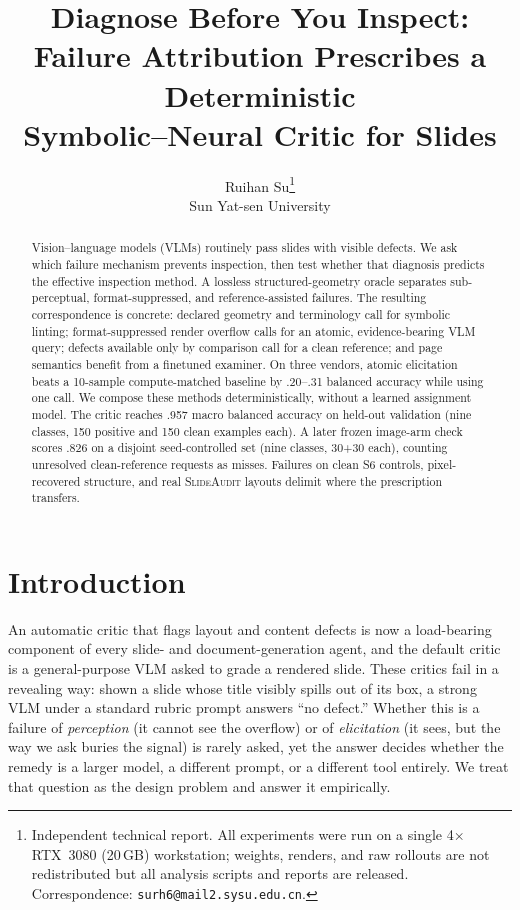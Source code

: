 \documentclass[10pt]{article}
\title{\bf Diagnose Before You Inspect:\\[2pt]
Failure Attribution Prescribes a Deterministic\\ Symbolic--Neural Critic for Slides}
\author{Ruihan Su\thanks{Independent technical report. All experiments were run on a single
4$\times$RTX~3080 (20\,GB) workstation; weights, renders, and raw rollouts are not redistributed but
all analysis scripts and reports are released. Correspondence: \texttt{surh6@mail2.sysu.edu.cn}.}\\[3pt]
\normalsize Sun Yat-sen University}
\date{}
\newcommand{\g}[1]{\textsf{#1}}        %
\begin{document}
\maketitle

\begin{abstract}
\noindent
Vision--language models (VLMs) routinely pass slides with visible defects. We ask which failure mechanism
prevents inspection, then test whether that diagnosis predicts the effective inspection method. A lossless
structured-geometry oracle separates sub-perceptual, format-suppressed, and reference-assisted failures.
The resulting correspondence is concrete: declared geometry and terminology call for symbolic linting;
format-suppressed render overflow calls for an atomic, evidence-bearing VLM query; defects available only by
comparison call for a clean reference; and page semantics benefit from a finetuned examiner. On three vendors,
atomic elicitation beats a 10-sample compute-matched baseline by .20--.31 balanced accuracy while using one call.
We compose these methods deterministically, without a learned assignment model. The critic reaches .957 macro
balanced accuracy on held-out validation (nine classes, 150 positive and 150 clean examples each). A later
frozen image-arm check scores .826 on a disjoint seed-controlled set (nine classes, 30+30 each), counting
unresolved clean-reference requests as misses. Failures on clean \g{S6} controls,
pixel-recovered structure, and real \textsc{SlideAudit} layouts delimit where the prescription transfers.
\end{abstract}

\section{Introduction}

An automatic critic that flags layout and content defects is now a load-bearing component of every slide- and
document-generation agent, and the default critic is a general-purpose VLM asked to grade a rendered slide.
These critics fail in a revealing way: shown a slide whose title visibly spills out of its box, a strong VLM
under a standard rubric prompt answers ``no defect.'' Whether this is a failure of
\emph{perception} (it cannot see the overflow) or of \emph{elicitation} (it sees, but the way we ask buries
the signal) is rarely asked, yet the answer decides whether the remedy is a larger model, a different prompt,
or a different tool entirely. We treat that question as the design problem and answer it empirically.
\end{document}
